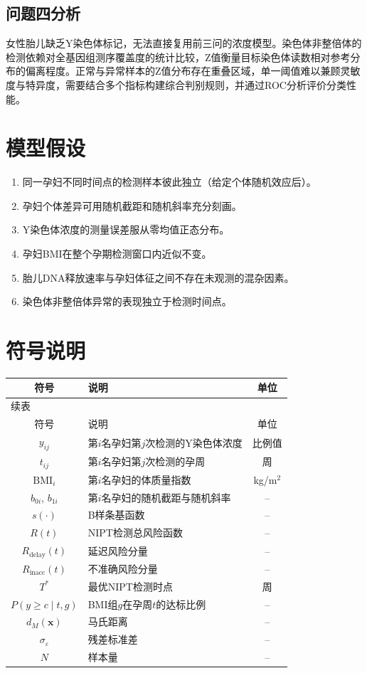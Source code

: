 \documentclass[withoutpreface]{cumcmthesis}
\begin{document}
\subsection{问题四分析}

女性胎儿缺乏Y染色体标记，无法直接复用前三问的浓度模型。染色体非整倍体的检测依赖对全基因组测序覆盖度的统计比较，Z值衡量目标染色体读数相对参考分布的偏离程度。正常与异常样本的Z值分布存在重叠区域，单一阈值难以兼顾灵敏度与特异度，需要结合多个指标构建综合判别规则，并通过ROC分析评价分类性能。

\section{模型假设}

\begin{enumerate}
    \item 同一孕妇不同时间点的检测样本彼此独立（给定个体随机效应后）。
    \item 孕妇个体差异可用随机截距和随机斜率充分刻画。
    \item Y染色体浓度的测量误差服从零均值正态分布。
    \item 孕妇BMI在整个孕期检测窗口内近似不变。
    \item 胎儿DNA释放速率与孕妇体征之间不存在未观测的混杂因素。
    \item 染色体非整倍体异常的表现独立于检测时间点。
\end{enumerate}

\section{符号说明}

\begin{longtable}{cp{24em}c}
\toprule
符号 & 说明 & 单位 \\
\midrule
\endfirsthead
\multicolumn{3}{l}{续表} \\
\toprule
符号 & 说明 & 单位 \\
\midrule
\endhead
\bottomrule
\endfoot
$y_{ij}$ & 第$i$名孕妇第$j$次检测的Y染色体浓度 & 比例值 \\
$t_{ij}$ & 第$i$名孕妇第$j$次检测的孕周 & 周 \\
$\mathrm{BMI}_i$ & 第$i$名孕妇的体质量指数 & kg/m$^2$ \\
$b_{0i},\, b_{1i}$ & 第$i$名孕妇的随机截距与随机斜率 & -- \\
$s(\cdot)$ & B样条基函数 & -- \\
$R(t)$ & NIPT检测总风险函数 & -- \\
$R_{\text{delay}}(t)$ & 延迟风险分量 & -- \\
$R_{\text{inacc}}(t)$ & 不准确风险分量 & -- \\
$T^*$ & 最优NIPT检测时点 & 周 \\
$P(y \geq c \mid t, g)$ & BMI组$g$在孕周$t$的达标比例 & -- \\
$d_M(\mathbf{x})$ & 马氏距离 & -- \\
$\sigma_\varepsilon$ & 残差标准差 & -- \\
$N$ & 样本量 & -- \\
\end{longtable}
\end{document}
